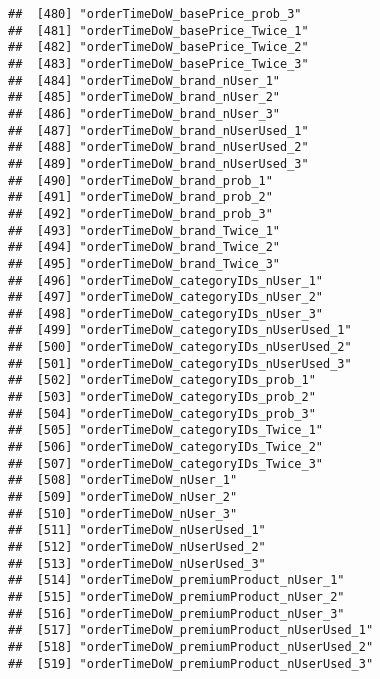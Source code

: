 \documentclass[10pt]{report}
\begin{document}
\begin{verbatim}
##  [480] "orderTimeDoW_basePrice_prob_3"                        
##  [481] "orderTimeDoW_basePrice_Twice_1"                       
##  [482] "orderTimeDoW_basePrice_Twice_2"                       
##  [483] "orderTimeDoW_basePrice_Twice_3"                       
##  [484] "orderTimeDoW_brand_nUser_1"                           
##  [485] "orderTimeDoW_brand_nUser_2"                           
##  [486] "orderTimeDoW_brand_nUser_3"                           
##  [487] "orderTimeDoW_brand_nUserUsed_1"                       
##  [488] "orderTimeDoW_brand_nUserUsed_2"                       
##  [489] "orderTimeDoW_brand_nUserUsed_3"                       
##  [490] "orderTimeDoW_brand_prob_1"                            
##  [491] "orderTimeDoW_brand_prob_2"                            
##  [492] "orderTimeDoW_brand_prob_3"                            
##  [493] "orderTimeDoW_brand_Twice_1"                           
##  [494] "orderTimeDoW_brand_Twice_2"                           
##  [495] "orderTimeDoW_brand_Twice_3"                           
##  [496] "orderTimeDoW_categoryIDs_nUser_1"                     
##  [497] "orderTimeDoW_categoryIDs_nUser_2"                     
##  [498] "orderTimeDoW_categoryIDs_nUser_3"                     
##  [499] "orderTimeDoW_categoryIDs_nUserUsed_1"                 
##  [500] "orderTimeDoW_categoryIDs_nUserUsed_2"                 
##  [501] "orderTimeDoW_categoryIDs_nUserUsed_3"                 
##  [502] "orderTimeDoW_categoryIDs_prob_1"                      
##  [503] "orderTimeDoW_categoryIDs_prob_2"                      
##  [504] "orderTimeDoW_categoryIDs_prob_3"                      
##  [505] "orderTimeDoW_categoryIDs_Twice_1"                     
##  [506] "orderTimeDoW_categoryIDs_Twice_2"                     
##  [507] "orderTimeDoW_categoryIDs_Twice_3"                     
##  [508] "orderTimeDoW_nUser_1"                                 
##  [509] "orderTimeDoW_nUser_2"                                 
##  [510] "orderTimeDoW_nUser_3"                                 
##  [511] "orderTimeDoW_nUserUsed_1"                             
##  [512] "orderTimeDoW_nUserUsed_2"                             
##  [513] "orderTimeDoW_nUserUsed_3"                             
##  [514] "orderTimeDoW_premiumProduct_nUser_1"                  
##  [515] "orderTimeDoW_premiumProduct_nUser_2"                  
##  [516] "orderTimeDoW_premiumProduct_nUser_3"                  
##  [517] "orderTimeDoW_premiumProduct_nUserUsed_1"              
##  [518] "orderTimeDoW_premiumProduct_nUserUsed_2"              
##  [519] "orderTimeDoW_premiumProduct_nUserUsed_3"              

\end{verbatim}
\end{document}
